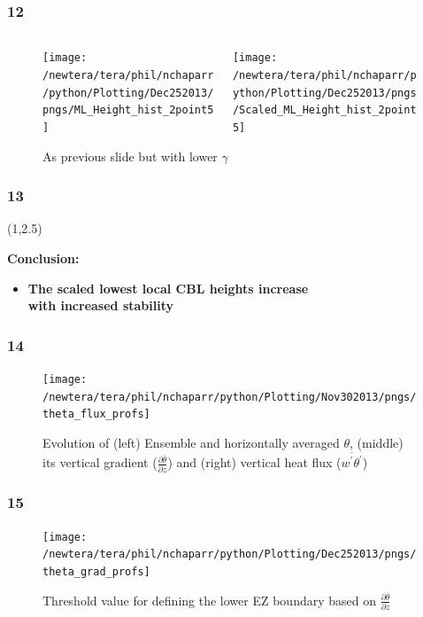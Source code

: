 \documentclass{beamer}
\newcommand\FrameText[1]{
\begin{textblock}{16}(1,2.5)
\raggedright #1
\end{textblock}}
\begin{document}
\begin{frame}
\frametitle{12}
\fontsize{12pt}{7.2}\selectfont
\begin{figure}
\begin{columns}[T]
   \begin{column}{.5\textwidth}
   \texttt{[image: /newtera/tera/phil/nchaparr/python/Plotting/Dec252013/pngs/ML\_Height\_hist\_2point5]} 
   \end{column} 
   
   \begin{column}{.5\textwidth}
    \texttt{[image: /newtera/tera/phil/nchaparr/python/Plotting/Dec252013/pngs/Scaled\_ML\_Height\_hist\_2point5]}
   \end{column}     
\end{columns}
\caption{As previous slide but with lower $\gamma$}
\end{figure}
\end{frame}


\begin{frame}
\frametitle{13}
\FrameText{\bf{\large Conclusion:}
\vspace{5mm}
\begin{itemize}
\item \bf{\large The scaled lowest local CBL heights increase\\
with increased stability}
\end{itemize}
}
\end{frame}

\begin{frame}
\frametitle{14}
\fontsize{12pt}{7.2}\selectfont
\begin{figure}
\centering
\texttt{[image: /newtera/tera/phil/nchaparr/python/Plotting/Nov302013/pngs/theta\_flux\_profs]}
\caption{Evolution of (left) Ensemble and horizontally averaged $\theta$, (middle) its vertical gradient ($\frac{\partial \overline{\theta}}{\partial z}$) and (right) vertical heat flux ($\overline{w^{'}\theta^{'}}$)}
\end{figure}
\end{frame}

\begin{frame}
\frametitle{15}
\fontsize{12pt}{7.2}\selectfont
\begin{figure}
\centering
\texttt{[image: /newtera/tera/phil/nchaparr/python/Plotting/Dec252013/pngs/theta\_grad\_profs]}
\caption{Threshold value for defining the lower EZ boundary based on $\frac{\partial \overline{\theta}}{\partial z}$}
\end{figure}
\end{frame}
\end{document}
